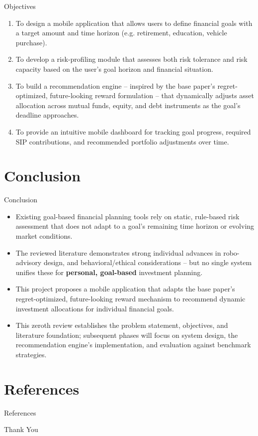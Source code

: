 \documentclass{beamer}
\begin{document}
\begin{frame}{Objectives}
\begin{enumerate}
    \item To design a mobile application that allows users to define financial goals with a target amount and time horizon (e.g. retirement, education, vehicle purchase).
    \item To develop a risk-profiling module that assesses both risk tolerance and risk capacity based on the user's goal horizon and financial situation.
    \item To build a recommendation engine -- inspired by the base paper's regret-optimized, future-looking reward formulation -- that dynamically adjusts asset allocation across mutual funds, equity, and debt instruments as the goal's deadline approaches.
    \item To provide an intuitive mobile dashboard for tracking goal progress, required SIP contributions, and recommended portfolio adjustments over time.
\end{enumerate}
\end{frame}

\section{Conclusion}

\begin{frame}{Conclusion}
\small
\begin{itemize}
    \item Existing goal-based financial planning tools rely on static, rule-based risk assessment that does not adapt to a goal's remaining time horizon or evolving market conditions.
    \item The reviewed literature demonstrates strong individual advances in robo-advisory design, and behavioral/ethical considerations -- but no single system unifies these for \textbf{personal, goal-based} investment planning.
    \item This project proposes a mobile application that adapts the base paper's regret-optimized, future-looking reward mechanism to recommend dynamic investment allocations for individual financial goals.
    \item This zeroth review establishes the problem statement, objectives, and literature foundation; subsequent phases will focus on system design, the recommendation engine's implementation, and evaluation against benchmark strategies.
\end{itemize}
\end{frame}

\section{References}

\begin{frame}[allowframebreaks]{References}
    \nocite{*}
    
    
\end{frame}

\begin{frame}
\centering
\Huge Thank You
\end{frame}
\end{document}
